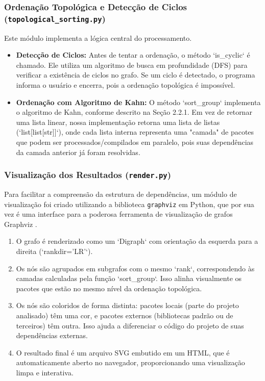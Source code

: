 \documentclass[12pt]{article}
\begin{document}
\subsubsection{Ordenação Topológica e Detecção de Ciclos (\texttt{topological\_sorting.py})}
Este módulo implementa a lógica central do processamento.
\begin{itemize}
    \item \textbf{Detecção de Ciclos:} Antes de tentar a ordenação, o método `is\_cyclic` é chamado. Ele utiliza um algoritmo de busca em profundidade (DFS) para verificar a existência de ciclos no grafo. Se um ciclo é detectado, o programa informa o usuário e encerra, pois a ordenação topológica é impossível.
    \item \textbf{Ordenação com Algoritmo de Kahn:} O método `sort\_group` implementa o algoritmo de Kahn, conforme descrito na Seção 2.2.1. Em vez de retornar uma lista linear, nossa implementação retorna uma lista de listas (`list[list[str]]`), onde cada lista interna representa uma "camada" de pacotes que podem ser processados/compilados em paralelo, pois suas dependências da camada anterior já foram resolvidas.
\end{itemize}

\subsubsection{Visualização dos Resultados (\texttt{render.py})}

Para facilitar a compreensão da estrutura de dependências, um módulo de visualização foi criado utilizando a biblioteca \texttt{graphviz} em Python, que por sua vez é uma interface para a poderosa ferramenta de visualização de grafos Graphviz \cite{graphviz}.

\begin{enumerate}
    \item O grafo é renderizado como um `Digraph` com orientação da esquerda para a direita (`rankdir='LR'`).
    \item Os nós são agrupados em subgrafos com o mesmo `rank`, correspondendo às camadas calculadas pela função `sort\_group`. Isso alinha visualmente os pacotes que estão no mesmo nível da ordenação topológica.
    \item Os nós são coloridos de forma distinta: pacotes locais (parte do projeto analisado) têm uma cor, e pacotes externos (bibliotecas padrão ou de terceiros) têm outra. Isso ajuda a diferenciar o código do projeto de suas dependências externas.
    \item O resultado final é um arquivo SVG embutido em um HTML, que é automaticamente aberto no navegador, proporcionando uma visualização limpa e interativa.
\end{enumerate}
\end{document}
